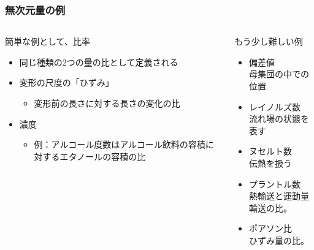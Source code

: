 \documentclass[unicode,12pt,aspectratio=169]{beamer}
\begin{document}
\begin{frame}
	\frametitle{無次元量の例}
		\begin{columns}[T, onlytextwidth]
				\begin{block}{簡単な例として、比率}
					\begin{itemize}
						\item 同じ種類の2つの量の比として定義される
						\item 変形の尺度の「ひずみ」
						\begin{itemize}
							\item 変形前の長さに対する長さの変化の比
						\end{itemize}
						\item 濃度
						\begin{itemize}
							\item 例：アルコール度数はアルコール飲料の容積に対するエタノールの容積の比
						\end{itemize}
					\end{itemize}
				\end{block}
				\begin{block}{もう少し難しい例}
					\begin{itemize}
						\item 偏差値\\母集団の中での位置
						\item レイノルズ数\\流れ場の状態を表す
						\item ヌセルト数\\伝熱を扱う
						\item プラントル数\\熱輸送と運動量輸送の比。
						\item ポアソン比\\ひずみ量の比。
					\end{itemize}
				\end{block}
		\end{columns}
\end{frame}
\end{document}
